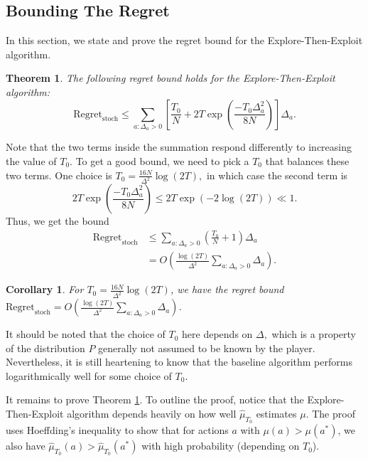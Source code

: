\documentclass[11pt]{article}
\newtheorem{thm}{Theorem}
\newtheorem{cor}{Corollary}
\newcommand{\hmtn}{\hat{\mu}_{T_0}}
\begin{document}
\subsection{Bounding The Regret}

In this section, we state and prove the regret bound for the Explore-Then-Exploit algorithm.

\begin{thm} \label{etebound}
The following regret bound holds for the Explore-Then-Exploit algorithm: \[\text{Regret}_\text{stoch} \leq \sum_{a:\Delta_a>0} \left[ \frac{T_0}{N} + 2T\exp\left(\frac{-T_0\Delta_a^2}{8N}\right) \right] \Delta_a.\]
\end{thm}

Note that the two terms inside the summation respond differently to increasing the value of $T_0.$ To get a good bound, we need to pick a $T_0$ that balances these two terms. One choice is $T_0=\frac{16N}{\Delta^2}\log(2T),$ in which case the second term is  \[2T\exp\left(\frac{-T_0\Delta_a^2}{8N} \right) \leq 2T\exp(-2\log(2T)) \ll 1.\]
Thus, we get the bound \begin{align*}\text{Regret}_\text{stoch} &\leq \sum_{a:\Delta_a>0} \left( \frac{T_0}{N} + 1 \right) \Delta_a \\ &= O\left( \frac{\log(2T)}{\Delta^2}  \sum_{a:\Delta_a>0} \Delta_a\right).\end{align*}

\begin{cor}
For $T_0 =  \frac{16N}{\Delta^2}\log(2T)$, we have the regret bound $\text{Regret}_\text{stoch}  = O\left( \frac{\log(2T)}{\Delta^2}  \sum_{a:\Delta_a>0} \Delta_a\right)$.
\end{cor}

It should be noted that the choice of $T_0$ here depends on $\Delta,$ which is a property of the distribution $P$ generally not assumed to be known by the player. Nevertheless, it is still heartening to know that the baseline algorithm performs logarithmically well for some choice of $T_0.$

It remains to prove Theorem \ref{etebound}. To outline the proof, notice that the Explore-Then-Exploit algorithm depends heavily on how well $\hat{\mu}_{T_0}$ estimates $\mu.$ The proof uses Hoeffding's inequality to show that for actions $a$ with $\mu(a)>\mu(a^*)$, we also have $\hmtn(a)>\hmtn(a^*)$ with high probability (depending on $T_0$).
\end{document}
